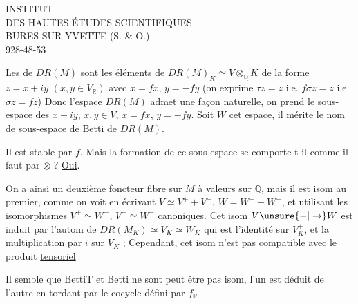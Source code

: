 \begin{center}
INSTITUT\\
DES HAUTES ÉTUDES SCIENTIFIQUES\\
BURES-SUR-YVETTE (S.-\&-O.)\\
928-48-53
\end{center}

Les  de $DR(M)$ sont les éléments de
$DR(M)_K\simeq V\otimes_{\mathbb Q}K$ de la forme $z=x+iy$ $(x,y\in V_{\mathbb R})$
avec $x=fx$, $y=-fy$ (on exprime $\tau z=z$ i.e. $f\sigma z=z$ i.e. $\sigma z=fz$)
 Donc l'espace $DR(M)$ admet une  façon naturelle,
 on prend le sous-espace des
$x+iy$, $x,y\in V$, $x=fx$, $y=-fy$. Soit $W$ cet espace, il
mérite le nom de \uline{sous-espace de Betti } de $DR(M)$.


Il est stable par $f$. Mais
la formation de ce sous-espace
 se comporte-t-il comme
il faut par $\otimes$ ? \uline{Oui}.

On a ainsi un deuxième foncteur fibre sur $M$
à valeurs sur $\mathbb Q$, mais il est isom  au
premier,  comme on voit en écrivant
$V\simeq V^++V^-$, $W=W^++W^-$, et utilisant les
isomorphismes $V^+\simeq W^+$, $V^-\simeq W^-$ canoniques.
Cet isom $V\unsure{-|\to}W$ est  induit par l'autom
de $DR(M_K)\simeq V_K\simeq W_K$ qui est l'identité sur
$V_K^+$, et la multiplication par $i$ sur $V_K^-$ ; Cependant, cet
isom \uline{n'est} \uline{pas} compatible avec le produit \uline{tensoriel}

Il semble que $\mathrm{Betti}\mathrm T$ et Betti ne sont  peut être pas isom,
l'un est déduit  de l'autre en tordant par le cocycle
défini par $f_{\mathbb R}$ ----
